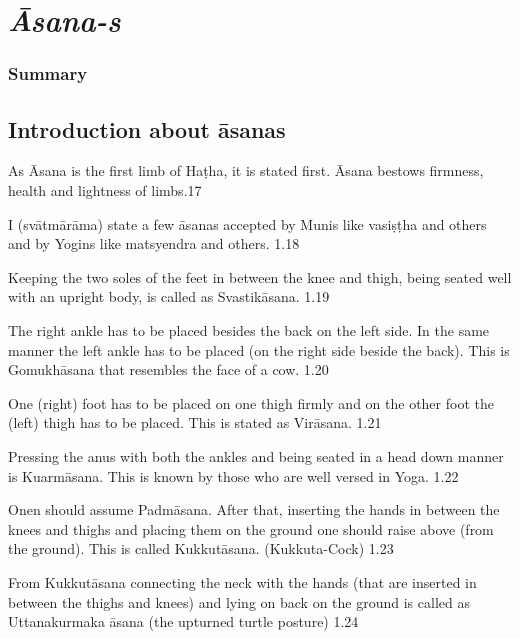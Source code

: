 \chapter{\textit{Āsana-s}}

\subsection*{Summary}

\section*{Introduction about āsanas}

As Āsana is the first limb of Haṭha, it is stated first. Āsana bestows firmness, health and lightness of limbs.17 

I (svātmārāma) state a few āsanas accepted by Munis like vasiṣṭha and others and by Yogins like matsyendra and others.  1.18


Keeping the two soles of the feet in between the knee and thigh, being seated well with an upright body, is called as Svastikāsana.  1.19


The right ankle has to be placed besides the back on the left side. In the same manner the left ankle has to be placed (on the right side beside the back). This is Gomukhāsana that resembles the face of a cow. 1.20


One (right) foot has to be placed on one thigh firmly and on the other foot the (left) thigh has to be placed. This is stated as Virāsana. 1.21


Pressing the anus with both the ankles and being seated in a head down manner is Kuarmāsana. This is known by those who are well versed in Yoga. 1.22


Onen should assume Padmāsana. After that, inserting the hands in between the knees and thighs and placing them on the ground one should raise above (from the ground). This is called Kukkutāsana. (Kukkuta-Cock) 1.23


From Kukkutāsana connecting the neck with the hands (that are inserted in between the thighs and knees) and lying on back on the ground is called as Uttanakurmaka āsana (the upturned turtle posture) 1.24

